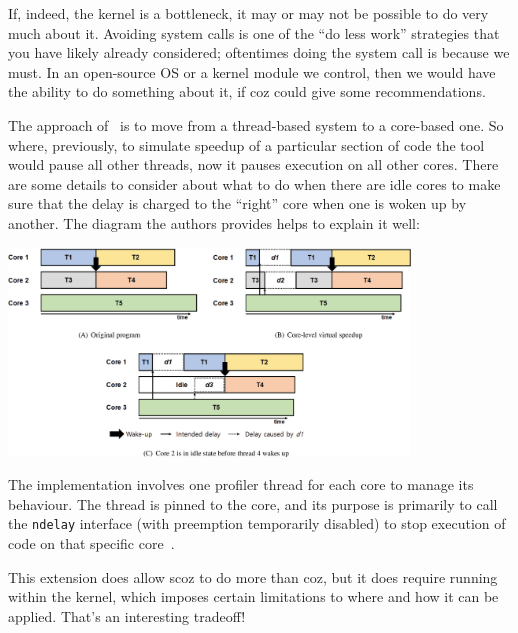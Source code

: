 If, indeed, the kernel is a bottleneck, it may or may not be possible to do very much about it. Avoiding system calls is one of the ``do less work'' strategies that you have likely already considered; oftentimes doing the system call is because we must. In an open-source OS or a kernel module we control, then we would have the ability to do something about it, if coz could give some recommendations.

The approach of~\cite{scoz} is to move from a thread-based system to a core-based one. So where, previously, to simulate speedup of a particular section of code the tool would pause all other threads, now it pauses execution on all other cores. There are some details to consider about what to do when there are idle cores to make sure that the delay is charged to the ``right'' core when one is woken up by another. The diagram the authors provides helps to explain it well:

\begin{center}
	\includegraphics[width=0.8\textwidth]{images/scoz-delay.jpg}
\end{center}

The implementation involves one profiler thread for each core to manage its behaviour. The thread is pinned to the core, and its purpose is primarily to call the \texttt{ndelay} interface (with preemption temporarily disabled) to stop execution of code on that specific core~\cite{scoz}. 

This extension does allow scoz to do more than coz, but it does require running within the kernel, which imposes certain limitations to where and how it can be applied. That's an interesting tradeoff!




